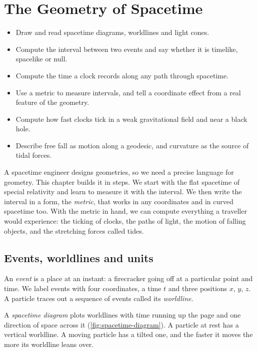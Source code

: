 \chapter{The Geometry of Spacetime}\label{ch:geometry}

\begin{goals}
\begin{itemize}
\item Draw and read spacetime diagrams, worldlines and light cones.
\item Compute the interval between two events and say whether it is timelike,
  spacelike or null.
\item Compute the time a clock records along any path through spacetime.
\item Use a metric to measure intervals, and tell a coordinate effect from a
  real feature of the geometry.
\item Compute how fast clocks tick in a weak gravitational field and near a
  black hole.
\item Describe free fall as motion along a geodesic, and curvature as the
  source of tidal forces.
\end{itemize}
\end{goals}

A spacetime engineer designs geometries, so we need a precise language for
geometry. This chapter builds it in steps. We start with the flat spacetime of
special relativity and learn to measure it with the interval. We then write the
interval in a form, the \emph{metric}, that works in any coordinates and in
curved spacetime too. With the metric in hand, we can compute everything a
traveller would experience: the ticking of clocks, the paths of light, the
motion of falling objects, and the stretching forces called tides.

\section{Events, worldlines and units}\label{sec:events}

An \emph{event} is a place at an instant: a firecracker going off at a
particular point and time. We label events with four coordinates, a time $t$
and three positions $x$, $y$, $z$. A particle traces out a sequence of events
called its \emph{worldline}.

A \emph{spacetime diagram} plots worldlines with time running up the page and
one direction of space across it (\cref{fig:spacetime-diagram}). A particle at
rest has a vertical worldline. A moving particle has a tilted one, and the
faster it moves the more its worldline leans over.

